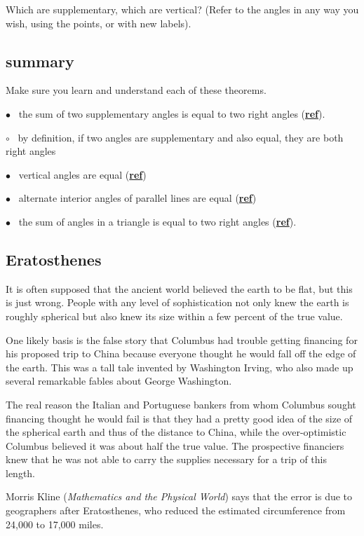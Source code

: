 \documentclass[11pt, oneside]{article}
\begin{document}
Which are supplementary, which are vertical?  (Refer to the angles in any way you wish, using the points, or with new labels).

\subsection*{summary}

Make sure you learn and understand each of these theorems.

$\bullet$ \ the sum of two supplementary angles is equal to two right angles (\hyperref[sec:supplementary_angle_theorem]{\textbf{ref}}).

$\circ$ \ by definition, if two angles are supplementary and also equal, they are both right angles

$\bullet$ \ vertical angles are equal (\hyperref[sec:vertical_angle_theorem]{\textbf{ref}})

$\bullet$ \ alternate interior angles of parallel lines are equal (\hyperref[sec:alternate_interior_angle_theorem]{\textbf{ref}})

$\bullet$ \ the sum of angles in a triangle  is equal to two right angles  (\hyperref[sec:triangle_sum_theorem]{\textbf{ref}}).

\subsection*{Eratosthenes}

It is often supposed that the ancient world believed the earth to be flat, but this is just wrong.  People with any level of sophistication not only knew the earth is roughly spherical but also knew its size within a few percent of the true value.

One likely basis is the false story that Columbus had trouble getting financing for his proposed trip to China because everyone thought he would fall off the edge of the earth.  This was a tall tale invented by Washington Irving, who also made up several remarkable fables about George Washington.

The real reason the Italian and Portuguese bankers from whom Columbus sought financing thought he would fail is that they had a pretty good idea of the size of the spherical earth and thus of the distance to China, while the over-optimistic Columbus believed it was about half the true value.  The prospective financiers knew that he was not able to carry the supplies necessary for a trip of this length.

Morris Kline (\emph{Mathematics and the Physical World}) says that the error is due to geographers after Eratosthenes, who reduced the estimated circumference from 24,000 to 17,000 miles.
\end{document}
